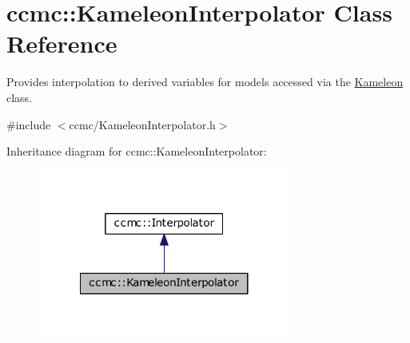 \hypertarget{classccmc_1_1_kameleon_interpolator}{\section{ccmc\-:\-:Kameleon\-Interpolator Class Reference}
\label{classccmc_1_1_kameleon_interpolator}
}


Provides interpolation to derived variables for models accessed via the \hyperlink{classccmc_1_1_kameleon}{Kameleon} class.  




{\ttfamily \#include $<$ccmc/\-Kameleon\-Interpolator.\-h$>$}



Inheritance diagram for ccmc\-:\-:Kameleon\-Interpolator\-:\nopagebreak
\begin{figure}[H]
\begin{center}
\leavevmode
\includegraphics[width=236pt]{classccmc_1_1_kameleon_interpolator__inherit__graph}
\end{center}
\end{figure}


